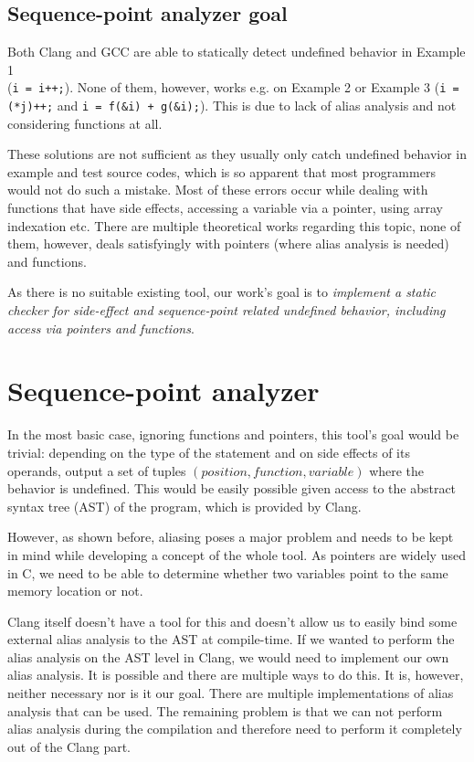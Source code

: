 \section{Sequence-point analyzer goal}
Both Clang and GCC are able to statically detect undefined behavior in Example 1\\ (\texttt{i = i++;}). None of them, however, works e.g. on Example 2 or Example 3 (\texttt{i = (*j)++;} and \texttt{i = f(\&i) + g(\&i);}). This is due to lack of alias analysis and not considering functions at all.

These solutions are not sufficient as they usually only catch undefined behavior in example and test source codes, which is so apparent that most programmers would not do such a mistake. Most of these errors occur while dealing with functions that have side effects, accessing a variable via a pointer, using array indexation etc.
There are multiple theoretical works regarding this topic, none of them, however, deals satisfyingly with pointers (where alias analysis is needed)~\cite{aliasAnalysis} and functions.

As there is no suitable existing tool, our work's goal is to \emph{implement a static checker for side-effect and sequence-point related undefined behavior, including access via pointers and functions}.

\chapter{Sequence-point analyzer}
In the most basic case, ignoring functions and pointers, this tool's goal would be trivial: depending on the type of the statement and on side effects of its operands, output a set of tuples $(position, function, variable)$ where the behavior is undefined. This would be easily possible given access to the abstract syntax tree (AST) of the program, which is provided by Clang.

However, as shown before, aliasing poses a major problem and needs to be kept in mind while developing a concept of the whole tool. As pointers are widely used in C, we need to be able to determine whether two variables point to the same memory location or not.

Clang itself doesn't have a tool for this and doesn't allow us to easily bind some external alias analysis to the AST at compile-time. If we wanted to perform the alias analysis on the AST level in Clang, we would need to implement our own alias analysis. It is possible and there are multiple ways to do this. It is, however, neither necessary nor is it our goal. There are multiple implementations  of alias analysis that can be used. The remaining problem is that we can not perform alias analysis during the compilation and therefore need to perform it completely out of the Clang part.

